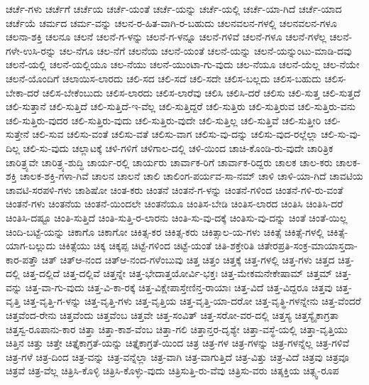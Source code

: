 {ಚರ್ಚೆ-ಗಳು
ಚರ್ಚೆಗೆ
ಚರ್ಚೆಯ
ಚರ್ಚೆ-ಯಂತೆ
ಚರ್ಚೆ-ಯನ್ನು
ಚರ್ಚೆ-ಯಲ್ಲಿ
ಚರ್ಚೆ-ಯಾ-ಗಿದೆ
ಚರ್ಚೆ-ಯಾದ
ಚರ್ಚೆಯೆ
ಚರ್ಮದ
ಚರ್ಮ-ವನ್ನು
ಚಲನ-ರ-ಹಿತ-ವಾಗಿ-ರ-ಬಹುದು
ಚಲನವಲನ-ಗಳಲ್ಲಿ
ಚಲನವಲನ-ಗಳೂ
ಚಲನಾ-ಶಕ್ತಿ
ಚಲನೂ
ಚಲನೆ
ಚಲನೆ-ಗ-ಳನ್ನು
ಚಲನೆ-ಗ-ಳನ್ನೂ
ಚಲನೆ-ಗಳಿವೆ
ಚಲನೆ-ಗಳೂ
ಚಲನೆ-ಗಳೆಲ್ಲ
ಚಲನೆ-ಗಳೇ-ಉಸಿ-ರನ್ನು
ಚಲ-ನೆಗೂ
ಚಲ-ನೆಗೆ
ಚಲನೆಯ
ಚಲನೆ-ಯಂತೆ
ಚಲನೆ-ಯನ್ನು
ಚಲನೆ-ಯನ್ನುಂಟು-ಮಾಡಿ-ದವು
ಚಲನೆ-ಯಲ್ಲಿ
ಚಲನೆ-ಯಲ್ಲಿಯೂ
ಚಲ-ನೆಯು
ಚಲನೆ-ಯುಂಟಾ-ಗು-ವುದು
ಚಲ-ನೆಯೂ
ಚಲನೆ-ಯೆಲ್ಲ
ಚಲ-ನೆಯೇ
ಚಲನೆ-ಯೊಂದಿಗೆ
ಚಲಾಯಿಸ-ಲಾರದು
ಚಲಿ-ಸದ
ಚಲಿ-ಸದೆ
ಚಲಿ-ಸದೇ
ಚಲಿಸ-ಬಲ್ಲದು
ಚಲಿಸ-ಬಹುದು
ಚಲಿಸ-ಬೇಕಾ-ದರೆ
ಚಲಿಸ-ಬೇಕೆಂಬುದು
ಚಲಿಸ-ಲಾರದು
ಚಲಿಸ-ಲಾರೆವು
ಚಲಿಸಿ
ಚಲಿಸಿ-ದರೆ
ಚಲಿಸು
ಚಲಿ-ಸುತ್ತ
ಚಲಿ-ಸುತ್ತದೆ
ಚಲಿ-ಸುತ್ತಾನೆ
ಚಲಿ-ಸುತ್ತಿದೆ
ಚಲಿ-ಸುತ್ತಿದೆ-ಇ-ವೆಲ್ಲ
ಚಲಿ-ಸುತ್ತಿದ್ದರೆ
ಚಲಿ-ಸುತ್ತಿರು
ಚಲಿ-ಸುತ್ತಿರುವ
ಚಲಿ-ಸುತ್ತಿರು-ವನು
ಚಲಿ-ಸುತ್ತಿರು-ವುದರ
ಚಲಿ-ಸುತ್ತಿರು-ವುದು
ಚಲಿ-ಸುತ್ತಿರು-ವುದೇ
ಚಲಿ-ಸುತ್ತಿಲ್ಲ
ಚಲಿ-ಸುತ್ತಿವೆ
ಚಲಿ-ಸುತ್ತೀರಿ
ಚಲಿ-ಸುತ್ತೇನೆ
ಚಲಿ-ಸುವ
ಚಲಿಸು-ವಂತೆ
ಚಲಿಸು-ವತೆ
ಚಲಿಸು-ವಾಗ
ಚಲಿಸು-ವು-ದನ್ನು
ಚಲಿಸು-ವುದ-ರಲ್ಲೆಲ್ಲಾ
ಚಲಿ-ಸು-ವು-ದಿಲ್ಲ
ಚಲಿ-ಸು-ವುದು
ಚಲ್ಲಾಟಕ್ಕೆ
ಚಳಿ-ಗಳಿಗೆ
ಚಳಿಗಾಲ-ದಲ್ಲಿ
ಚಳಿ-ಯಿಂದ
ಚಾಚಿ-ಕೊಂಡಿ-ರು-ವುದೇ
ಚಾರಿತ್ರಿಕ
ಚಾರಿತ್ರ್ಯವೇ
ಚಾರಿತ್ರ್ಯ-ಶುದ್ಧಿ
ಚಾರ್ಯ-ರಲ್ಲಿ
ಚಾರ್ಯರು
ಚಾರ್ವಾಕ-ರಿಗೆ
ಚಾರ್ವಾಕ-ರಿದ್ದರು
ಚಾಲಕ
ಚಾಲ-ಕರು
ಚಾಲಕ-ಶಕ್ತಿ
ಚಾಲಕ-ಶಕ್ತಿ-ಗಳಾ-ಗಿವೆ
ಚಾಲನ
ಚಾಲನೆ
ಚಾಲಿ
ಚಾಲಿಂಗ-ಪರ್ಯವ-ಸಾ-ನಮ್
ಚಾಳಿ
ಚಾಳಿ-ಯಾ-ಗಿದೆ
ಚಾವಟಿಯ
ಚಾವಟಿ-ಸರಪಳಿ-ಗಳು
ಚಾಶಿಷೋ
ಚಿಂತ-ಕರು
ಚಿಂತನೆ
ಚಿಂತನೆ-ಗ-ಳನ್ನು
ಚಿಂತನೆ-ಗಳಿಂದ
ಚಿಂತನೆ-ಗಳಿ-ರು-ವಂತೆ
ಚಿಂತನೆ-ಗಳು
ಚಿಂತನೆಯ
ಚಿಂತನೆ-ಯಿಂದಲೇ
ಚಿಂತನೆಯೂ
ಚಿಂತಿಸ-ಬೇಡಿ
ಚಿಂತಿಸ-ಲಾರದ
ಚಿಂತಿಸಿ
ಚಿಂತಿಸಿ-ದರೆ
ಚಿಂತಿಸಿ-ದಷ್ಟೂ
ಚಿಂತಿ-ಸುತ್ತಿದೆ
ಚಿಂತಿ-ಸುತ್ತಿ-ರ-ಲಾರನು
ಚಿಂತಿ-ಸು-ವು-ದಕ್ಕೆ
ಚಿಂತಿಸು-ವು-ದನ್ನು
ಚಿಂತೆ
ಚಿಂತೆ-ಯಿಲ್ಲ
ಚಿಂದಿ-ಬಟ್ಟೆ-ಯನ್ನು
ಚಿಕಾಗೊ
ಚಿಕಾಗೋ
ಚಿಕಿತ್ಸ-ಕರ
ಚಿಕಿತ್ಸ-ಕರು
ಚಿಕಿತ್ಸಾಲ-ಯ-ಗಳು
ಚಿಕಿತ್ಸೆ
ಚಿಕಿತ್ಸೆ-ಗಳಲ್ಲಿ
ಚಿಕಿತ್ಸೆ-ಯಾಗ-ಬಲ್ಲುದು
ಚಿಕಿತ್ಸೆಯು
ಚಿಕ್ಕ
ಚಿಕ್ಕಪ್ಪ
ಚಿಟ್ಟೆ-ಗಳಿಂದ
ಚಿಟ್ಟೆ-ಯಂತೆ
ಚಿತಿ-ಶಕ್ತೇರಿತಿ
ಚಿತೇರಪ್ರತಿ-ಸಂಕ್ರ-ಮಾಯಾಸ್ತದಾ-ಕಾರ-ಪತ್ತೌ
ಚಿತ್
ಚಿತ್ಆ-ನಂದ
ಚಿತ್ಆ-ನಂದ-ಗಳೆಂಬುವು
ಚಿತ್ತ
ಚಿತ್ತಂ
ಚಿತ್ತಕ್ಕೆ
ಚಿತ್ತ-ಗಳಲ್ಲಿ
ಚಿತ್ತ-ಗಳು
ಚಿತ್ತದ
ಚಿತ್ತ-ದಲ್ಲಿ
ಚಿತ್ತ-ದಲ್ಲಿದೆ
ಚಿತ್ತ-ದಲ್ಲಿವೆ
ಚಿತ್ತನ್ನೇ
ಚಿತ್ತ-ಭೇದಾತ್ತಯೋರ್ವಿ-ಭಕ್ತಃ
ಚಿತ್ತ-ಮೇಕಮನೇಕೇಷಾಮ್
ಚಿತ್ತಮ್
ಚಿತ್ತ-ವನ್ನು
ಚಿತ್ತ-ವಾ-ಗು-ವುದು
ಚಿತ್ತ-ವಿ-ಕಾ-ರಕ್ಕೆ
ಚಿತ್ತ-ವಿಕ್ಷೇಪಾಸ್ತೇಣಿನ್ತ-ರಾಯಾಃ
ಚಿತ್ತ-ವಿದೆ
ಚಿತ್ತ-ವಿದ್ದರೂ
ಚಿತ್ತವು
ಚಿತ್ತ-ವೃತ್ತಿ
ಚಿತ್ತ-ವೃತ್ತಿ-ಗ-ಳನ್ನು
ಚಿತ್ತ-ವೃತ್ತಿ-ಗಳು
ಚಿತ್ತ-ವೃತ್ತಿಯ
ಚಿತ್ತ-ವೃತ್ತಿ-ಯಾ-ದರೋ
ಚಿತ್ತ-ವೃತ್ಥಿ-ಗಳನ್ನೇನು
ಚಿತ್ತ-ವೆಂದರೆ
ಚಿತ್ತವೆಂದ-ರೇನು
ಚಿತ್ತವೆಂದು
ಚಿತ್ತವೆಂಬ
ಚಿತ್ತವೇ
ಚಿತ್ತ-ಸಂವಿತ್
ಚಿತ್ತ-ಸರೋ-ವರ-ದಲ್ಲಿ
ಚಿತ್ತಸ್ಯ
ಚಿತ್ತಸ್ಯೈಕಾಗ್ರತಾ
ಚಿತ್ತಸ್ವ-ರೂಪಾನು-ಕಾರ
ಚಿತ್ತಾ
ಚಿತ್ತಾ-ಕಾಶ-ವೆಂಬ
ಚಿತ್ತಾ-ಗಲಿ
ಚಿತ್ತಾನ್ತರ-ದೃಶ್ಯೇ
ಚಿತ್ತಾ-ವಸ್ಥೆ-ಯಲ್ಲಿ
ಚಿತ್ತಾ-ವೃತ್ತಿಯು
ಚಿತ್ತಿನ
ಚಿತ್ತು
ಚಿತ್ತೇ
ಚಿತ್ತೈಕಾಗ್ರತೆ-ಯನ್ನು
ಚಿತ್ತೈಕಾಗ್ರತೆ-ಯಿಂದ
ಚಿತ್ರ
ಚಿತ್ರ-ಗಳ
ಚಿತ್ರ-ಗಳನ್ನು
ಚಿತ್ರ-ಗಳನ್ನೆಲ್ಲ
ಚಿತ್ರ-ಗಳಿವೆ
ಚಿತ್ರ-ಗಳೆ
ಚಿತ್ರ-ದಿಂದ
ಚಿತ್ರ-ವನ್ನು
ಚಿತ್ರ-ವನ್ನೆಲ್ಲಾ
ಚಿತ್ರ-ವಾಗಿ
ಚಿತ್ರ-ವಾಗುತ್ತಿದೆ
ಚಿತ್ರ-ವಿತ್ತು
ಚಿತ್ರ-ವಿದೆ
ಚಿತ್ರವು
ಚಿತ್ರವೂ
ಚಿತ್ರವೆ
ಚಿತ್ರ-ವೆಲ್ಲ
ಚಿತ್ರಿಸಿ-ಕೊಳ್ಳಿ
ಚಿತ್ರಿಸಿ-ಕೊಳ್ಳು-ವುದು
ಚಿತ್ರಿಸುತ್ತಿ-ರು-ವೆವು
ಚಿತ್ರಿಸು-ವರು
ಚಿತ್ಶಕ್ತಿಯ
ಚಿತ್ಸ್ವ-ರೂಪ
}
